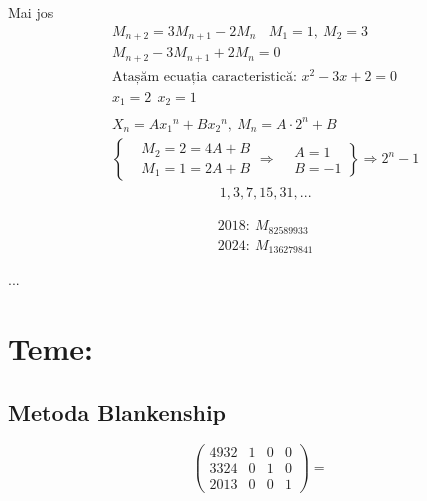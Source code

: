 \documentclass[12pt]{article}
\theoremstyle{definition}
\begin{document}
Mai jos 
\[\begin{aligned}
&M_{n+2}=3M_{n+1}-2M_n \ \ \ \ M_1=1, \ M_2=3 \\
&M_{n+2}-3M_{n+1}+2M_n=0\\
&\text{Atașăm ecuația caracteristică: }x^2-3x+2=0\\
&x_1=2 \ \ x_2=1\\
&\\
&X_n=A{x_1}^n+B{x_2}^n, \ M_n=A\cdot 2^n +B\\
	&\left\{ \begin{aligned}
		&M_2=2=4A+B\\
		&M_1=1=2A+B
	\end{aligned} \right. \Rightarrow \left. \begin{aligned}
									&A=1\\
									&B=-1
									\end{aligned} \right\} \Rightarrow 2^n-1
\end{aligned}\]
\[\begin{aligned}
&1,3,7,15,31,...
\end{aligned}\]

\[\begin{aligned}
& 2018:\ M_{82589933}\\
& 2024:\  M_{136279841}
\end{aligned}\]

...
\section*{Teme:}
\subsection*{Metoda Blankenship}
\[
\begin{pmatrix}
4932 & 1 & 0 & 0\\
3324 & 0 & 1 & 0\\
2013 & 0 & 0 & 1
\end{pmatrix} =

\]


%	
%
\end{document}
